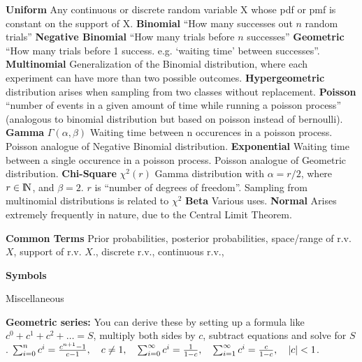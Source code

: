 {{\bf Uniform} Any continuous or discrete random variable X whose pdf or pmf is constant on the support of X.\quad
{\bf Binomial } ``How many successes out $n$ random trials''\quad
{\bf Negative Binomial} ``How many trials before $n$ successes''\quad
{\bf Geometric} ``How many trials before 1 success. e.g. `waiting time' between successes''.\quad
{\bf Multinomial} Generalization of the Binomial distribution, where each experiment can have more than two possible outcomes.\quad
{\bf Hypergeometric} distribution arises when sampling from two classes without replacement.\quad
{\bf Poisson} ``number of events in a given amount of time while running a poisson process'' (analogous to binomial distribution but based on poisson instead of bernoulli).\quad
{\bf Gamma} $\Gamma(\alpha,\beta)$ Waiting time between n occurences in a poisson process. Poisson analogue of Negative Binomial distribution.\quad
{\bf Exponential} Waiting time between a single occurence in a poisson process. Poisson analogue of Geometric distribution.\quad
{\bf Chi-Square} $\chi^2(r)$ Gamma distribution with $\alpha=r/2$, where $r \in \rm I\!N$, and $\beta=2$. $r$ is ``number of degrees of freedom''. Sampling from multinomial distributions is related to $\chi^2$\quad
{\bf Beta} Various uses.\quad
{\bf Normal} Arises extremely frequently in nature, due to the Central Limit Theorem.\quad

{\bf Common Terms} Prior probabilities, posterior probabilities, space/range of r.v. $X$, support of r.v. $X$., discrete r.v., continuous r.v.,

{\bf Symbols}
\Hrule
{}

{\bigger Miscellaneous}

{\bf Geometric series:} You can derive these by setting up a formula like $c^0+c^1+c^2+\dots = S$, multiply both sides by $c$, subtract equations and solve for $S$. \quad $\sum_{i=0}^n c^i = {c^{n+1} - 1 \over c -1}, \quad c \neq 1,\quad \sum_{i=0}^\infty c^i = {1 \over 1 - c},\quad \sum_{i=1}^\infty c^i = {c \over 1 - c}, \quad \vert c \vert < 1$.

}

